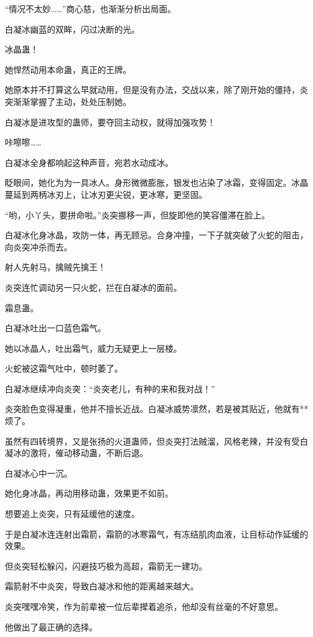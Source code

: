 \begin{this_body}
“情况不太妙……”商心慈，也渐渐分析出局面。

白凝冰幽蓝的双眸，闪过决断的光。

冰晶蛊！

她悍然动用本命蛊，真正的王牌。

她原本并不打算这么早就动用，但是没有办法，交战以来，除了刚开始的僵持，炎突渐渐掌握了主动，处处压制她。

白凝冰是进攻型的蛊师，要夺回主动权，就得加强攻势！

咔嚓嚓……

白凝冰全身都响起这种声音，宛若水动成冰。

眨眼间，她化为为一具冰人。身形微微膨胀，银发也沾染了冰霜，变得固定。冰晶蔓延到两柄冰刃上，让冰刃更尖锐，更冰寒，更坚固。

“哟，小丫头，要拼命啦。”炎突挪移一声，但旋即他的笑容僵滞在脸上。

白凝冰化身冰晶，攻防一体，再无顾忌。合身冲撞，一下子就突破了火蛇的阻击，向炎突冲杀而去。

射人先射马，擒贼先擒王！

炎突连忙调动另一只火蛇，拦在白凝冰的面前。

霜息蛊。

白凝冰吐出一口蓝色霜气。

她以冰晶人，吐出霜气，威力无疑更上一层楼。

火蛇被这霜气吐中，顿时萎了。

白凝冰继续冲向炎突：“炎突老儿，有种的来和我对战！”

炎突脸色变得凝重，他并不擅长近战。白凝冰威势凛然，若是被其贴近，他就有**烦了。

虽然有四转境界，又是张扬的火道蛊师，但炎突打法贼溜，风格老辣，并没有受白凝冰的激将，催动移动蛊，不断后退。

白凝冰心中一沉。

她化身冰晶，再动用移动蛊，效果更不如前。

想要追上炎突，只有延缓他的速度。

于是白凝冰连连射出霜箭，霜箭的冰寒霜气，有冻结肌肉血液，让目标动作延缓的效果。

但炎突轻松躲闪，闪避技巧极为高超，霜箭无一建功。

霜箭射不中炎突，导致白凝冰和他的距离越来越大。

炎突嘿嘿冷笑，作为前辈被一位后辈撵着追杀，他却没有丝毫的不好意思。

他做出了最正确的选择。


\end{this_body}
